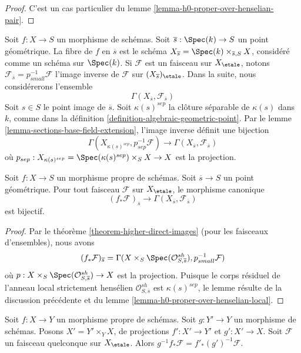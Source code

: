 \begin{proof}
C'est un cas particulier du lemme \ref{lemma-h0-proper-over-henselian-pair}.
\end{proof}

\noindent
Soit $f : X \to S$ un morphisme de schémas. Soit
$\overline{s} : \Spec(k) \to S$ un point géométrique. La fibre
de $f$ en $\overline{s}$ est le schéma
$X_{\overline{s}} = \Spec(k) \times_{\overline{s}, S} X$, considéré
comme un schéma sur $\Spec(k)$. Si $\mathcal{F}$ est un faisceau sur
$X_\etale$, notons
$\mathcal{F}_{\overline{s}} = p_{small}^{-1}\mathcal{F}$
l'image inverse de $\mathcal{F}$ sur $(X_{\overline{s}})_\etale$.
Dans la suite, nous considérerons l'ensemble
$$
\Gamma(X_{\overline{s}}, \mathcal{F}_{\overline{s}})
$$
Soit $s \in S$ le point image de $\overline{s}$. Soit $\kappa(s)^{sep}$
la clôture séparable de $\kappa(s)$ dans $k$, comme dans la
définition \ref{definition-algebraic-geometric-point}.
Par le lemme \ref{lemma-sections-base-field-extension},
l'image inverse définit une bijection
$$
\Gamma(X_{\kappa(s)^{sep}},
p_{sep}^{-1} \mathcal{F})
\longrightarrow
\Gamma(X_{\overline{s}}, \mathcal{F}_{\overline{s}})
$$
où $p_{sep} : X_{\kappa(s)^{sep}} = \Spec(\kappa(s)^{sep}) \times_S X \to X$
est la projection.

\begin{lemma}
\label{lemma-proper-pushforward-stalk}
Soit $f : X \to S$ un morphisme propre de schémas. Soit
$\overline{s} \to S$ un point géométrique.
Pour tout faisceau $\mathcal{F}$ sur $X_\etale$,
le morphisme canonique
$$
(f_*\mathcal{F})_{\overline{s}} \longrightarrow
\Gamma(X_{\overline{s}}, \mathcal{F}_{\overline{s}})
$$
est bijectif.
\end{lemma}

\begin{proof}
Par le théorème \ref{theorem-higher-direct-images} (pour les faisceaux d'ensembles),
nous avons
$$
(f_*\mathcal{F})_{\overline{s}} =
\Gamma(X \times_S \Spec(\mathcal{O}_{S, \overline{s}}^{sh}),
p_{small}^{-1}\mathcal{F})
$$
où $p : X \times_S \Spec(\mathcal{O}_{S, \overline{s}}^{sh}) \to X$
est la projection. Puisque le corps résiduel de l'anneau local strictement
hensélien $\mathcal{O}_{S, \overline{s}}^{sh}$ est $\kappa(s)^{sep}$,
le lemme résulte de la discussion précédente et du
lemme \ref{lemma-h0-proper-over-henselian-local}.
\end{proof}

\begin{lemma}
\label{lemma-proper-base-change-f-star}
Soit $f : X \to Y$ un morphisme propre de schémas. Soit $g : Y' \to Y$
un morphisme de schémas. Posons $X' = Y' \times_Y X$, de projections
$f' : X' \to Y'$ et $g' : X' \to X$. Soit $\mathcal{F}$ un faisceau quelconque sur
$X_\etale$. Alors $g^{-1}f_*\mathcal{F} = f'_*(g')^{-1}\mathcal{F}$.
\end{lemma}

